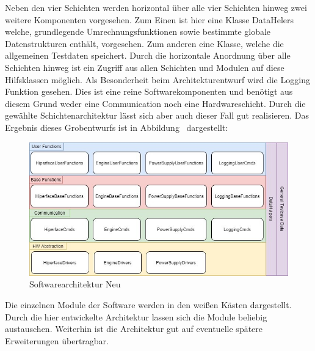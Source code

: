 Neben den vier Schichten werden horizontal über alle vier Schichten hinweg zwei weitere Komponenten vorgesehen.
Zum Einen ist hier eine Klasse DataHelers welche, grundlegende Umrechnungsfunktionen sowie bestimmte globale Datenstrukturen enthält, vorgesehen. Zum anderen eine Klasse, welche die allgemeinen Testdaten speichert. Durch die horizontale Anordnung über alle Schichten hinweg ist ein Zugriff aus allen Schichten und Modulen auf diese Hilfsklassen möglich.
Als Besonderheit beim Architekturentwurf wird die Logging Funktion gesehen. Dies ist eine reine Softwarekomponenten und benötigt aus diesem Grund weder eine Communication noch eine Hardwareschicht. Durch die gewählte Schichtenarchitektur lässt sich aber auch dieser Fall gut realisieren.
Das Ergebnis dieses Grobentwurfs ist in Abbildung \dq {}\dq~dargestellt:
\begin{figure}[h]
  \centering
   \includegraphics[width=1\textwidth]{img/SW_Arch_neu.jpg} 
   \caption{Softwarearchitektur Neu}
   \label{fig:SW_Arch_neu.jpg}
\end{figure}
\newpage
Die einzelnen Module der Software werden in den weißen Kästen dargestellt. Durch die hier entwickelte Architektur lassen sich die Module beliebig austauschen. Weiterhin ist die Architektur gut auf eventuelle spätere Erweiterungen übertragbar. 
